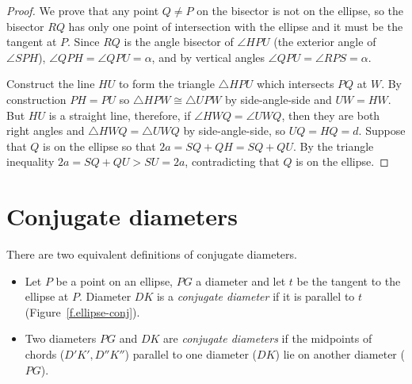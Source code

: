 \begin{proof} 
We prove that any point $Q\neq P$ on the bisector is not on the ellipse, so the bisector $RQ$ has only one point of intersection with the ellipse and it must be the tangent at $P$. Since $RQ$ is the angle bisector of $\angle HPU$ (the exterior angle of $\angle SPH$), $\angle QPH =\angle QPU=\alpha$, and by vertical angles $\angle QPU=\angle RPS=\alpha$.

Construct the line $HU$ to form the triangle $\triangle HPU$ which intersects $PQ$ at $W$. By construction $PH=PU$ so $\triangle HPW\cong \triangle UPW$ by side-angle-side and $UW=HW$. But $HU$ is a straight line, therefore, if $\angle HWQ=\angle UWQ$, then they are both right angles and $\triangle HWQ=\triangle UWQ$ by side-angle-side, so $UQ=HQ=d$. Suppose that $Q$ is on the ellipse so that $2a=SQ+QH=SQ+QU$. By the triangle inequality $2a=SQ+QU>SU=2a$, contradicting that $Q$ is on the ellipse.\hqed
\end{proof}



\section{Conjugate diameters}

\begin{definition}\label{def.conjugate}
There are two equivalent definitions of conjugate diameters.
\begin{itemize}
\item Let $P$ be a point on an ellipse, $PG$ a diameter and let $t$ be the tangent to the ellipse at $P$. Diameter $DK$ is a \emph{conjugate diameter} if it is parallel to $t$ (Figure~\ref{f.ellipse-conj}).
\item Two diameters $PG$ and $DK$ are \emph{conjugate diameters} if the midpoints of chords ($D'K', D''K''$) parallel to one diameter ($DK$) lie on another diameter ($PG$).
\end{itemize}
\end{definition}


